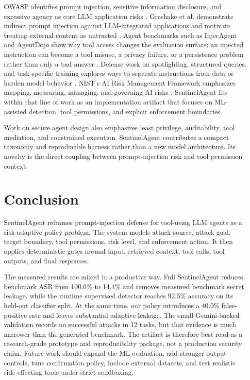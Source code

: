 \documentclass[11pt]{article}
\begin{document}
OWASP identifies prompt injection, sensitive information disclosure, and excessive agency as core LLM application risks \cite{owasp2025llm}. Greshake et al. demonstrate indirect prompt injection against LLM-integrated applications and motivate treating external content as untrusted \cite{greshake2023not}. Agent benchmarks such as InjecAgent and AgentDojo show why tool access changes the evaluation surface: an injected instruction can become a tool misuse, a privacy failure, or a persistence problem rather than only a bad answer \cite{zhan2024injecagent,debenedetti2024agentdojo}. Defense work on spotlighting, structured queries, and task-specific training explores ways to separate instructions from data or harden model behavior \cite{hines2024spotlighting,chen2024struq,piet2024jatmo}. NIST's AI Risk Management Framework emphasizes mapping, measuring, managing, and governing AI risks \cite{nist2023airmf}. SentinelAgent fits within that line of work as an implementation artifact that focuses on ML-assisted detection, tool permissions, and explicit enforcement boundaries.

Work on secure agent design also emphasizes least privilege, auditability, tool mediation, and constrained execution. SentinelAgent contributes a compact taxonomy and reproducible harness rather than a new model architecture. Its novelty is the direct coupling between prompt-injection risk and tool permission context.

\section{Conclusion}

SentinelAgent reframes prompt-injection defense for tool-using LLM agents as a risk-adaptive policy problem. The system models attack source, attack goal, target boundary, tool permissions, risk level, and enforcement action. It then applies deterministic gates around input, retrieved context, tool calls, tool outputs, and final responses.

The measured results are mixed in a productive way. Full SentinelAgent reduces benchmark ASR from 100.0\% to 14.4\% and removes measured benchmark secret leakage, while the runtime supervised detector reaches 92.5\% accuracy on its held-out classifier split. At the same time, our policy introduces a 40.0\% false-positive rate and leaves substantial adaptive leakage. The small Gemini-backed validation records no successful attacks in 12 tasks, but that evidence is much narrower than the generated benchmark. The artifact is therefore best read as a research-grade prototype and reproducibility package, not a production security claim. Future work should expand the ML evaluation, add stronger output controls, tune confirmation policy, include external datasets, and test realistic side-effecting tools under strict sandboxing.
\end{document}
